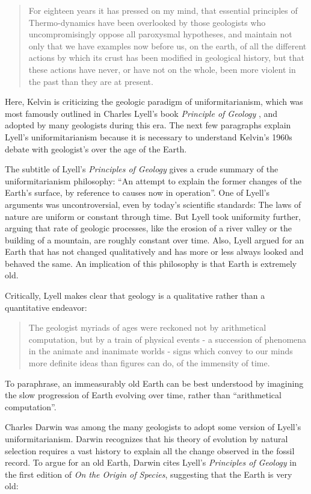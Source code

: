 \documentclass[12pt]{article}
\begin{document}
\begin{quote}
  For eighteen years it has pressed on my mind, that essential principles of Thermo-dynamics have been overlooked by those geologists who uncompromisingly oppose all paroxysmal hypotheses, and maintain not only that we have examples now before us, on the earth, of all the different actions by which its crust has been modified in geological history, but that these actions have never, or have not on the whole, been more violent in the past than they are at present.
\end{quote}
Here, Kelvin is criticizing the geologic paradigm of uniformitarianism, which was most famously outlined in Charles Lyell's book \emph{Principle of Geology} \citep{Lyell_1833}, and adopted by many geologists during this era. The next few paragraphs explain Lyell's uniformitarianism because it is necessary to understand Kelvin's 1960s debate with geologist's over the age of the Earth.

The subtitle of Lyell's \emph{Principles of Geology} gives a crude summary of the uniformitarianism philosophy: ``An attempt to explain the former changes of the Earth's surface, by reference to causes now in operation''. One of Lyell's arguments was uncontroversial, even by today's scientific standards: The laws of nature are uniform or constant through time. But Lyell took uniformity further, arguing that rate of geologic processes, like the erosion of a river valley or the building of a mountain, are roughly constant over time. Also, Lyell argued for an Earth that has not changed qualitatively and has more or less always looked and behaved the same. An implication of this philosophy is that Earth is extremely old.

Critically, Lyell makes clear that geology is a qualitative rather than a quantitative endeavor:

\begin{quote}
  The geologist myriads of ages were reckoned not by arithmetical computation, but by a train of physical events - a succession of phenomena in the animate and inanimate worlds - signs which convey to our minds more definite ideas than figures can do, of the immensity of time. \citep{Lyell_1833}
\end{quote}
To paraphrase, an immeasurably old Earth can be best understood by imagining the slow progression of Earth evolving over time, rather than ``arithmetical computation''.

Charles Darwin was among the many geologists to adopt some version of Lyell's uniformitarianism. Darwin recognizes that his theory of evolution by natural selection requires a vast history to explain all the change observed in the fossil record. To argue for an old Earth, Darwin cites Lyell's \emph{Principles of Geology} in the first edition of \emph{On the Origin of Species}, suggesting that the Earth is very old:
\end{document}
